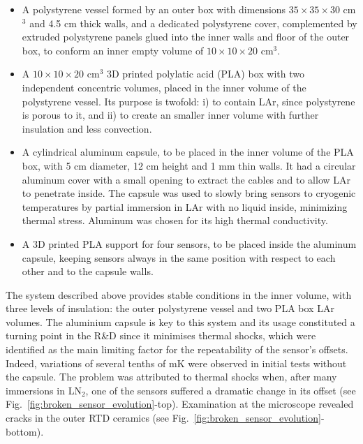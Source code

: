 \begin{itemize}
    \item A polystyrene vessel formed by an outer box with dimensions $35\times35\times30$ cm$^3$ and 4.5 cm thick walls, and a dedicated polystyrene cover, complemented by extruded polystyrene panels glued into the inner walls and floor of the outer box, to conform an inner empty volume of $10\times10\times20$ cm$^3$. 
    \item A $10\times10\times20$ cm$^3$ 3D printed polylatic acid (PLA) box with two independent concentric volumes, placed in the inner volume of the polystyrene vessel. Its purpose is twofold: i) to contain LAr, since polystyrene is porous to it, and ii) to create an smaller inner volume  with further insulation and less convection.  
    \item A cylindrical aluminum capsule, to be placed in the inner volume of the PLA box,  with 5 cm diameter, 12 cm height and 1 mm thin walls. It had a circular aluminum cover with a small opening to extract the cables and to allow LAr to penetrate inside. The capsule was used to slowly bring sensors to cryogenic temperatures by partial immersion in LAr with no liquid inside, minimizing thermal stress. Aluminum was chosen for its high thermal conductivity.      
    \item  A 3D printed PLA support for four sensors, to be placed inside the aluminum capsule, keeping sensors always in the same position with respect to each other and to the capsule walls. 
\end{itemize}

The system described above provides stable conditions in the inner volume, with three levels of insulation: the outer polystyrene vessel and two PLA box LAr volumes. The aluminium capsule is key to this system and its usage constituted a turning point in the R\&D since it minimises thermal shocks, which were identified as the main limiting factor for the repeatability of the sensor's offsets. Indeed, variations of several tenths of mK were observed in initial tests without the capsule. The problem was attributed to thermal shocks when, after many immersions in LN$_{2}$, one of the sensors suffered a dramatic change in its offset (see Fig.~\ref{fig:broken_sensor_evolution}-top). Examination at the microscope revealed cracks in the outer RTD ceramics (see Fig.~\ref{fig:broken_sensor_evolution}-bottom). 

